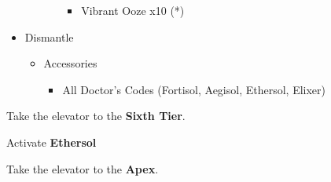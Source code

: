 \documentclass{report}
\begin{document}
\begin{upgrade}
\begin{itemize}
\begin{itemize}
\begin{itemize}
            \begin{itemize}
                \item Vibrant Ooze x10 (*)
            \end{itemize}
        \end{itemize}
    \end{itemize}
    \item Dismantle
    \begin{itemize}
        \item Accessories
        \begin{itemize}
            \item All Doctor's Codes (Fortisol, Aegisol, Ethersol, Elixer)
        \end{itemize}
    \end{itemize}
\end{itemize}
\end{upgrade}

\renewcommand{\first}{[1] Riot Shield (\syn/\sen/\rav)}
\renewcommand{\second}{[2] Relentless Assault (\com/\rav/\rav)}
\renewcommand{\third}{[3] Mystic Tower (\rav/\sen/\rav)}
\renewcommand{\fourth}{[4] Aggression (\com/\com/\rav)}
\renewcommand{\fifth}{[5] Matador (\rav/\sen/\sab)}
\renewcommand{\sixth}{[6] Aggression (\com/\com/\rav)}

Take the elevator to the \textbf{Sixth Tier}.

Activate \textbf{Ethersol}

Take the elevator to the \textbf{Apex}.
\end{document}

